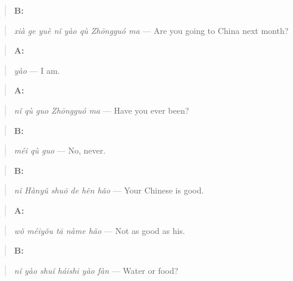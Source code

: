 \begin{quote}
\textbf{B:} 
\end{quote}

\begin{quote}
\emph{xià ge yuè nǐ yào qù Zhōngguó ma} — Are you going to China next month?
\end{quote}

\begin{quote}
\textbf{A:} 
\end{quote}

\begin{quote}
\emph{yào} — I am.
\end{quote}

\begin{quote}
\textbf{A:} 
\end{quote}

\begin{quote}
\emph{nǐ qù guo Zhōngguó ma} — Have you ever been?
\end{quote}

\begin{quote}
\textbf{B:} 
\end{quote}

\begin{quote}
\emph{méi qù guo} — No, never.
\end{quote}

\begin{quote}
\textbf{B:} 
\end{quote}

\begin{quote}
\emph{nǐ Hànyǔ shuō de hěn hǎo} — Your Chinese is good.
\end{quote}

\begin{quote}
\textbf{A:} 
\end{quote}

\begin{quote}
\emph{wǒ méiyǒu tā nàme hǎo} — Not as good as his.
\end{quote}

\begin{quote}
\textbf{B:} 
\end{quote}

\begin{quote}
\emph{nǐ yào shuǐ háishi yào fàn} — Water or food?
\end{quote}

